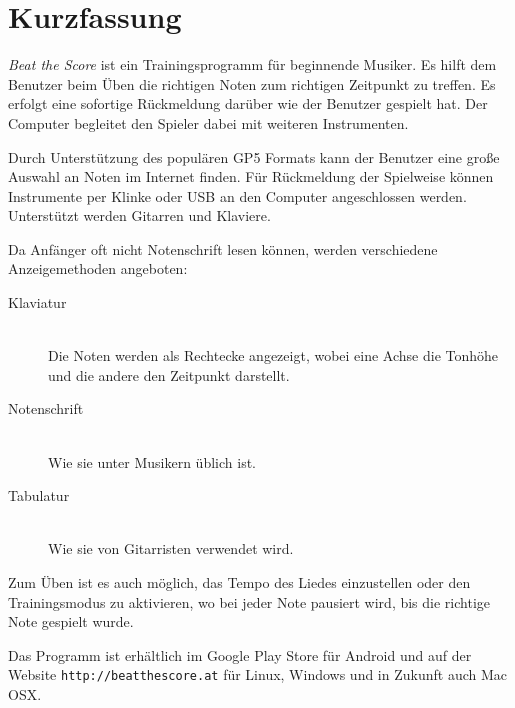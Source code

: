 
\chapter{Kurzfassung}

\emph{Beat the Score} ist ein Trainingsprogramm für beginnende Musiker. Es hilft dem Benutzer beim Üben die richtigen Noten zum richtigen Zeitpunkt zu treffen. Es erfolgt eine sofortige Rückmeldung darüber wie der Benutzer gespielt hat. Der Computer begleitet den Spieler dabei mit weiteren Instrumenten.

Durch Unterstützung des populären GP5 Formats kann der Benutzer eine große Auswahl an Noten im Internet finden.
Für Rückmeldung der Spielweise können Instrumente per Klinke oder USB an den Computer angeschlossen werden. Unterstützt werden Gitarren und Klaviere.

Da Anfänger oft nicht Notenschrift lesen können, werden verschiedene Anzeigemethoden angeboten: 
\begin{description}
	\item[Klaviatur] \hfil \\ Die Noten werden als Rechtecke angezeigt, wobei eine Achse die Tonhöhe und die andere den Zeitpunkt darstellt.
	\item[Notenschrift] \hfil \\ Wie sie unter Musikern üblich ist.
	\item[Tabulatur] \hfil \\ Wie sie von Gitarristen verwendet wird.
\end{description}

Zum Üben ist es auch möglich, das Tempo des Liedes einzustellen oder den Trainingsmodus zu aktivieren, wo bei jeder Note pausiert wird, bis die richtige Note gespielt wurde.

Das Programm ist erhältlich im Google Play Store für Android und auf der Website {\tt http://beatthescore.at} für Linux, Windows und in Zukunft auch Mac OSX.